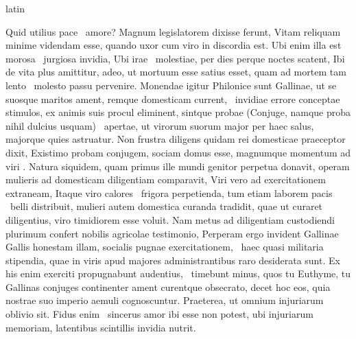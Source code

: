 \documentclass[12pt]{book}
\renewenvironment{latin}
    	{\begin{hyphenrules}{latin}}
    	{\end{hyphenrules}}
\begin{document}
\begin{pages}
\begin{latin}
\begin{Leftside}
                        Quid utilius pace ﻿\ampersand\ amore? 
                        Magnum legislatorem dixisse ferunt, Vitam reliquam minime videndam esse, quando uxor cum viro in discordia est. 
                        Ubi enim illa est morosa ﻿\ampersand\ jurgiosa invidia, Ubi irae ﻿\ampersand\ molestiae, per dies perque noctes scatent, 
                        Ibi de vita  plus amittitur, adeo, ut mortuum esse satius esset, quam ad mortem tam lento ﻿\ampersand\ molesto passu pervenire. 
                        Monendae igitur Philonice sunt Gallinae, ut se suosque maritos ament, remque domesticam current, ﻿\ampersand\ invidiae errore conceptae stimulos, 
                        ex animis suis procul eliminent, sintque probae (Conjuge, namque proba nihil  dulcius usquam) ﻿\ampersand\ apertae, 
                        ut virorum suorum major per haec salus, majorque quies astruatur. 
                        Non frustra diligens quidam rei domesticae praeceptor dixit, 
                        Existimo probam conjugem, sociam domus esse, magnumque momentum ad viri . 
                        Natura siquidem, quam primus ille mundi genitor perpetua  donavit, operam mulieris ad domesticam diligentiam comparavit, 
                        Viri vero ad exercitationem extraneam, 
                        Itaque viro calores ﻿\ampersand\ frigora perpetienda, 
                        tum   etiam laborem pacis ﻿\ampersand\ belli distribuit, mulieri autem domestica  curanda tradidit, 
                        quae ut curaret diligentius, viro timidiorem esse voluit. 
                        Nam metus ad diligentiam custodiendi plurimum confert nobilis agricolae testimonio, 
                        Perperam ergo invident Gallinae Gallis honestam illam, socialis pugnae exercitationem, ﻿\ampersand\ haec quasi militaria stipendia, 
                        quae in viris  apud majores administrantibus raro desiderata sunt. 
                        Ex his enim exerciti propugnabunt audentius, ﻿\ampersand\ timebunt minus, 
                        quos tu Euthyme, tu Gallinas conjuges continenter ament curentque obsecrato, decet hoc eos, 
                        quia  nostrae suo imperio aemuli cognoscuntur. 
                        Praeterea, ut omnium injuriarum oblivio sit. 
                        Fidus enim ﻿\ampersand\ sincerus amor ibi esse non potest, ubi injuriarum memoriam, latentibus scintillis invidia nutrit. 

\end{Leftside}
\end{latin}
\end{pages}
\end{document}
